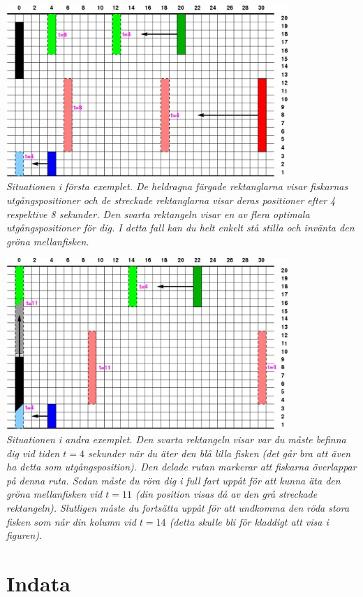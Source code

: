 \includegraphics[width=0.8\textwidth]{fiskspelet.png}\\
\emph{Situationen i första exemplet. De heldragna färgade rektanglarna visar fiskarnas utgångspositioner och de streckade rektanglarna visar deras positioner efter 4 respektive 8 sekunder. Den svarta rektangeln visar en av flera optimala utgångspositioner för dig. I detta fall kan du helt enkelt stå stilla och invänta den gröna mellanfisken.}

\includegraphics[width=0.8\textwidth]{fiskspelet2.png}\\
\emph{Situationen i andra exemplet. Den svarta rektangeln visar var du måste befinna dig vid tiden $t=4$ sekunder när du äter den blå lilla fisken (det går bra att även ha detta som utgångsposition). Den delade rutan markerar att fiskarna överlappar på denna ruta. Sedan måste du röra dig i full fart uppåt för att kunna äta den gröna mellanfisken vid $t=11$ (din position visas då av den grå streckade rektangeln). Slutligen måste du fortsätta uppåt för att undkomma den röda stora fisken som når din kolumn vid $t=14$ (detta skulle bli för kladdigt att visa i figuren).}



\section*{Indata}

